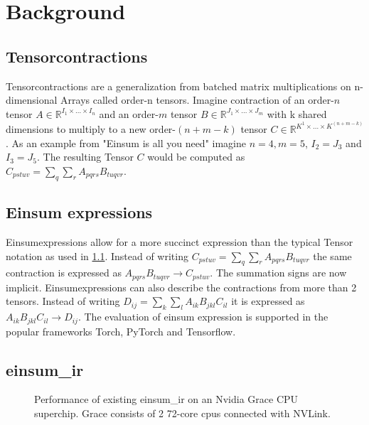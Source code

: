 \section{Background}

\subsection{Tensorcontractions}
\label{Tensorcontractions}

Tensorcontractions are a generalization from batched matrix multiplications on n-dimensional Arrays called order-n tensors.
Imagine contraction of an order-$n$ tensor $A \in \mathbb{R}^{I_1\times\dots\times I_n}$ and an order-$m$ tensor $B \in \mathbb{R}^{J_1\times\dots\times J_m}$ with k shared dimensions to multiply to a new order-$(n+m-k)$ tensor $C \in \mathbb{R}^{K^1\times\dots\times K^{(n+m-k)}}$.
As an example from "Einsum is all you need" \cite{einsum_is_all_you_need} imagine $n=4, m=5$, $I_2 = J_3$ and $I_3 = J_5$.
The resulting Tensor $C$ would be computed as $C_{pstuv}=\sum_{q}\sum_{r}A_{pqrs}B_{tuqvr}$.

\subsection{Einsum expressions}

Einsumexpressions allow for a more succinct expression than the typical Tensor notation as used in \ref{Tensorcontractions}.
Instead of writing $C_{pstuv}=\sum_{q}\sum_{r}A_{pqrs}B_{tuqvr}$ the same contraction is expressed as $A_{pqrs}B_{tuqvr} \rightarrow C_{pstuv}$.
The summation signs are now implicit.
Einsumexpressions can also describe the contractions from more than 2 tensors\cite{einsum_is_all_you_need}.
Instead of writing $D_{ij} = \sum_{k}\sum_{l}A_{ik}B_{jkl}C_{il}$ it is expressed as $A_{ik}B_{jkl}C_{il} \rightarrow D_{ij}$.
The evaluation of einsum expression is supported in the popular frameworks Torch\cite{torch}, PyTorch\cite{pytorch} and Tensorflow\cite{tensorflow}.

\subsection{einsum\_ir}

\begin{figure}[ht]
  \caption{
    Performance of existing einsum\_ir on an Nvidia Grace CPU superchip.
    Grace consists of 2 72-core cpus connected with NVLink.
  }
  \label{fig:perf_threads}
\end{figure}

